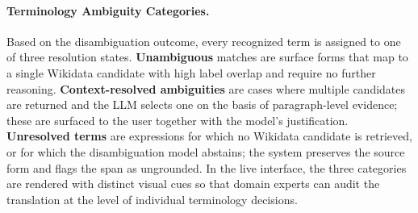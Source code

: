 \documentclass[11pt]{article}
\newcommand{\moduleEvaluation}{LLM-as-a-judge Evaluation}
\begin{document}
\paragraph{Terminology Ambiguity Categories.}
Based on the disambiguation outcome, every recognized term is assigned to one of three resolution states. \textbf{Unambiguous} matches are surface forms that map to a single Wikidata candidate with high label overlap and require no further reasoning. \textbf{Context-resolved ambiguities} are cases where multiple candidates are returned and the LLM selects one on the basis of paragraph-level evidence; these are surfaced to the user together with the model's justification. \textbf{Unresolved terms} are expressions for which no Wikidata candidate is retrieved, or for which the disambiguation model abstains; the system preserves the source form and flags the span as ungrounded. In the live interface, the three categories are rendered with distinct visual cues so that domain experts can audit the translation at the level of individual terminology decisions.



    
    
\end{document}
